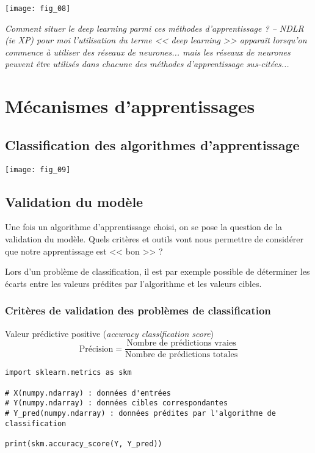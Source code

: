 \begin{center}
\texttt{[image: fig\_08]}
\end{center}

\textit{Comment situer le deep learning parmi ces méthodes d'apprentissage ? -- NDLR (ie XP) pour moi l'utilisation du terme << deep learning >> apparaît lorsqu'on commence à utiliser des réseaux de neurones... mais les réseaux de neurones peuvent être utilisés dans chacune des méthodes d'apprentissage sus-citées...}


\section{Mécanismes d'apprentissages}

\subsection{Classification des algorithmes d'apprentissage}

\begin{center}
\texttt{[image: fig\_09]}
\end{center}


\subsection{Validation du modèle}
Une fois un algorithme d'apprentissage choisi, on se pose la question de la validation du modèle. Quels critères et outils vont nous permettre de considérer que notre apprentissage est << bon >> ?

Lors d'un problème de classification, il est par exemple possible de déterminer les écarts entre les valeurs prédites par l'algorithme et les valeurs cibles.

\subsubsection{Critères de validation des problèmes de classification}

\begin{defi}
Valeur prédictive positive (\textit{accuracy classification score})
$$
\text{Précision} = \dfrac{\text{Nombre de prédictions vraies}}{\text{Nombre de prédictions totales}}
$$
\end{defi}

\begin{lstlisting}
import sklearn.metrics as skm

# X(numpy.ndarray) : données d'entrées
# Y(numpy.ndarray) : données cibles correspondantes
# Y_pred(numpy.ndarray) : données prédites par l'algorithme de classification

print(skm.accuracy_score(Y, Y_pred))
\end{lstlisting}



